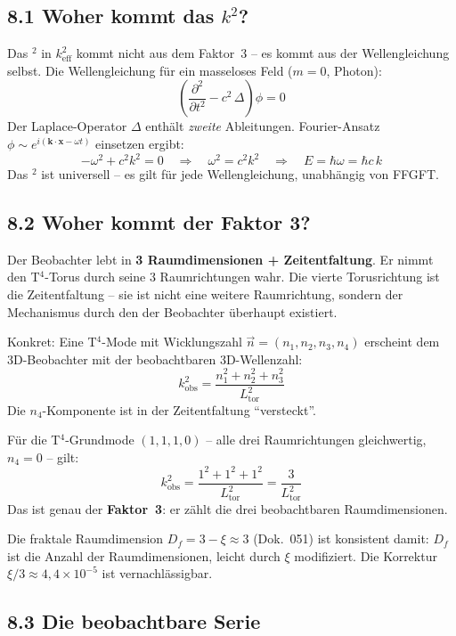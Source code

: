 \subsection*{8.1 Woher kommt das $k^2$?}

Das $^2$ in $k_\mathrm{eff}^2$ kommt nicht aus dem Faktor~3 --
es kommt aus der Wellengleichung selbst.
Die Wellengleichung für ein masseloses Feld ($m=0$, Photon):
\[
  \left(\frac{\partial^2}{\partial t^2} - c^2\,\Delta\right)\phi = 0
\]
Der Laplace-Operator $\Delta$ enthält \emph{zweite} Ableitungen.
Fourier-Ansatz $\phi \sim e^{i(\mathbf{k}\cdot\mathbf{x}-\omega t)}$
einsetzen ergibt:
\[
  -\omega^2 + c^2 k^2 = 0
  \quad\Rightarrow\quad
  \omega^2 = c^2 k^2
  \quad\Rightarrow\quad
  E = \hbar\omega = \hbar c\,k
\]
Das $^2$ ist universell -- es gilt für jede Wellengleichung,
unabhängig von FFGFT.

\subsection*{8.2 Woher kommt der Faktor 3?}

Der Beobachter lebt in \textbf{3 Raumdimensionen + Zeitentfaltung}.
Er nimmt den T$^4$-Torus durch seine 3 Raumrichtungen wahr.
Die vierte Torusrichtung ist die Zeitentfaltung -- sie ist nicht
eine weitere Raumrichtung, sondern der Mechanismus durch den der
Beobachter überhaupt existiert.

Konkret: Eine T$^4$-Mode mit Wicklungszahl
$\vec{n} = (n_1, n_2, n_3, n_4)$ erscheint dem 3D-Beobachter
mit der beobachtbaren 3D-Wellenzahl:
\[
  k_\mathrm{obs}^2 = \frac{n_1^2 + n_2^2 + n_3^2}{L_\mathrm{tor}^2}
\]
Die $n_4$-Komponente ist in der Zeitentfaltung ``versteckt''.

Für die T$^4$-Grundmode $(1,1,1,0)$ -- alle drei Raumrichtungen
gleichwertig, $n_4 = 0$ -- gilt:
\[
  k_\mathrm{obs}^2 = \frac{1^2+1^2+1^2}{L_\mathrm{tor}^2}
  = \frac{3}{L_\mathrm{tor}^2}
\]
Das ist genau der \textbf{Faktor~3}: er zählt die drei
beobachtbaren Raumdimensionen.

Die fraktale Raumdimension $D_f = 3 - \xi \approx 3$
(Dok.~051) ist konsistent damit: $D_f$ ist die Anzahl der
Raumdimensionen, leicht durch $\xi$ modifiziert. Die Korrektur
$\xi/3 \approx 4{,}4 \times 10^{-5}$ ist vernachlässigbar.

\subsection*{8.3 Die beobachtbare Serie}

